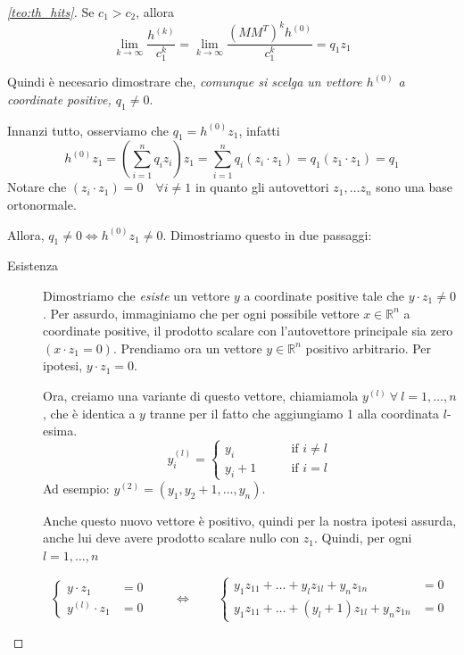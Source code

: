 \begin{proof}[\autoref{teo:th_hits}]
    Se $c_1 > c_2$, allora 
    \[
    \lim_{k\to\infty}\frac{h^{(k)}}{c_1^k} = \lim_{k\to\infty} \frac{(M M^T)^k h^{(0)}}{c_1^k} = q_1 z_1
    \]
    
    Quindi è necesario dimostrare che, \textit{comunque si scelga un vettore $h^{(0)}$ a coordinate positive, $q_1 \neq 0$}.
    
    Innanzi tutto, osserviamo che $q_1 = h^{(0)} z_1$, infatti
    \[
    h^{(0)} z_1 = \left( \sum_{i=1}^{n} q_i z_i \right) z_1 = \sum_{i=1}^{n} q_i (z_i \cdot z_1) = q_1 (z_1 \cdot z_1) = q_1
    \]
    Notare che $(z_i \cdot z_1) = 0\quad \forall i \neq 1$ in quanto gli autovettori $z_1, \dots z_n$ sono una base ortonormale.

    Allora, $q_1 \neq 0 \iff h^{(0)} z_1 \neq 0$. Dimostriamo questo in due passaggi:

    \begin{description}
        \item[Esistenza] Dimostriamo che \textit{esiste} un vettore $y$ a coordinate positive tale che $y \cdot z_1 \neq 0$. Per assurdo, immaginiamo che per ogni possibile vettore $x \in \mathbb{R}^n$ a coordinate positive, il prodotto scalare con l'autovettore principale sia zero $(x \cdot z_1 =0 )$. Prendiamo ora un vettore $y \in \mathbb{R}^n$ positivo arbitrario. Per ipotesi, $y \cdot z_1 = 0$.
        
        Ora, creiamo una variante di questo vettore, chiamiamola $y^{(l)}\ \forall\ l = 1, \dots, n$, che è identica a $y$ tranne per il fatto che aggiungiamo 1 alla coordinata $l$-esima.
        \[
            y^{(l)}_i =  
            \begin{cases}
                y_i &\qquad \text{if } i \neq l \\
                y_i + 1 &\qquad \text{if } i = l
            \end{cases}  
        \]
        Ad esempio: $y^{(2)} = (y_1, y_2 + 1, \dots, y_n)$.
        
        Anche questo nuovo vettore è positivo, quindi per la nostra ipotesi assurda, anche lui deve avere prodotto scalare nullo con $z_1$. Quindi, per ogni $l = 1, \dots, n$

        \[
            \begin{cases}
                y \cdot z_1 &= 0 \\
                y^{(l)} \cdot z_1 &= 0
            \end{cases}
            \qquad\iff\qquad
            \begin{cases}
                y_1z_{11} + \dots + y_l z_{1l} + y_n z_{1n} &= 0 \\
                y_1z_{11} + \dots + (y_l+1) z_{1l} + y_n z_{1n} &= 0
            \end{cases}
        \]


\end{description}
\end{proof}
